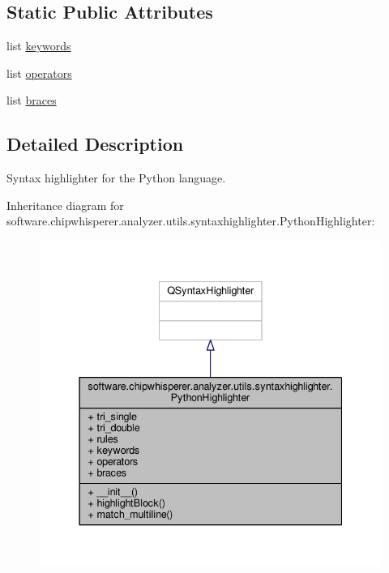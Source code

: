\subsection*{Static Public Attributes}
\begin{DoxyCompactItemize}
\item 
list \hyperlink{classsoftware_1_1chipwhisperer_1_1analyzer_1_1utils_1_1syntaxhighlighter_1_1PythonHighlighter_ad5fa814a6a65820676451524e140fdcd}{keywords}
\item 
list \hyperlink{classsoftware_1_1chipwhisperer_1_1analyzer_1_1utils_1_1syntaxhighlighter_1_1PythonHighlighter_af01544c219b1f3b65d672c4f992c0b0f}{operators}
\item 
list \hyperlink{classsoftware_1_1chipwhisperer_1_1analyzer_1_1utils_1_1syntaxhighlighter_1_1PythonHighlighter_ad05b5e381fdda163b18406549b46dd7c}{braces}
\end{DoxyCompactItemize}


\subsection{Detailed Description}
\begin{DoxyVerb}Syntax highlighter for the Python language.
\end{DoxyVerb}
 

Inheritance diagram for software.\+chipwhisperer.\+analyzer.\+utils.\+syntaxhighlighter.\+Python\+Highlighter\+:\nopagebreak
\begin{figure}[H]
\begin{center}
\leavevmode
\includegraphics[width=337pt]{d3/db0/classsoftware_1_1chipwhisperer_1_1analyzer_1_1utils_1_1syntaxhighlighter_1_1PythonHighlighter__inherit__graph}
\end{center}
\end{figure}


